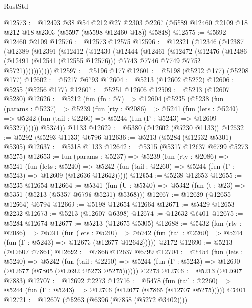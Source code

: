 \begin{lexlean}{RustStd}
\begin{coremodule}
@12573 := @12493
    @38
    @54
    @212
    @27
    @2303
    @2267
    (@5589 @12460 @2109 @18 @212 @18 @2303 (@5597 (@5598 @12460 @18)) @5848)
@12575 := @5692 @12460 @2109
@12576 := @12573 @12575
@12596 := @12321
    (@12346
      (@12387
        (@12389
          (@12391
            (@12412
              (@12430
                (@12444
                  (@12461
                    (@12472
                      (@12476
                        (@12486
                          (@12491 (@12541 (@12555 @12576)))
                          @7743
                          @7746
                          @7749
                          @7752
                          @5721)))))))))))
@12597 := @5196 @177
@12601 := @5198 (@5202 @177) (@5208 @177)
@12602 := @5217 @6793
@12604 := @5213 (@12602 @5232)
@12606 := @5255 (@5256 @177)
@12607 := @5251 @12606
@12609 := @5213 (@12607 @5280)
@12626 := @5212
    (fun (fn : @7) =>
    @12604
      (@5235
        (@5238
          (fun (params : @5237) =>
          @5239
            (fun (rty : @2086) =>
            @5241
              (fun (lets : @5240) =>
              @5242 (fun (tail : @2260) => @5244 (fun (Γ : @5243) => @12609 @5327))))))
        @5374))
    @1133
@12629 := @5380 (@12602 (@5230 @1133))
@12632 := @5292 (@5293 @1133) @6796
@12636 := @5213 (@5284 (@12632 @5301) @5305)
@12637 := @5318 @1133
@12642 := @5315 (@5317 @12637 @6799 @5273 @5275)
@12653 := fun (params : @5237) =>
  @5239
    (fun (rty : @2086) =>
    @5241
      (fun (lets : @5240) =>
      @5242 (fun (tail : @2260) => @5244 (fun (Γ : @5243) => @12609 (@12636 @12642)))))
@12654 := @5238 @12653
@12655 := @5235 @12654
@12664 := @5341
    (fun (U : @5340) => @5342 (fun (t : @23) => @5351 (@5213 (@5357 @6796 @5231) @5368)))
@12667 := @12629 (@12655 @12664) @6794
@12669 := @5198 @12654 @12664
@12671 := @5429 @12653 @2232
@12673 := @5213 (@12607 @6398)
@12674 := @12632 @6401
@12675 := @5284 @12674
@12677 := @5213 (@12675 @5305)
@12688 := @5432
    (fun (rty : @2086) =>
    @5241
      (fun (lets : @5240) =>
      @5242 (fun (tail : @2260) => @5244 (fun (Γ : @5243) => @12673 (@12677 @12642)))))
    @2172
@12690 := @5213 (@12607 @7861)
@12692 := @7866 @12637 @6799
@12704 := @5454
    (fun (lets : @5240) =>
    @5242
      (fun (tail : @2260) =>
      @5244 (fun (Γ : @5243) => @12690 (@12677 (@7865 (@12692 @5273 @5275))))))
    @2273
@12706 := @5213 (@12607 @7883)
@12707 := @12692 @2273
@12716 := @5478
    (fun (tail : @2260) => @5244 (fun (Γ : @5243) => @12706 (@12677 (@7865 (@12707 @5275)))))
    @3401
@12721 := @12607 (@5263 (@6396 (@7858 (@5272 @3402))))

\end{coremodule}
\end{lexlean}
